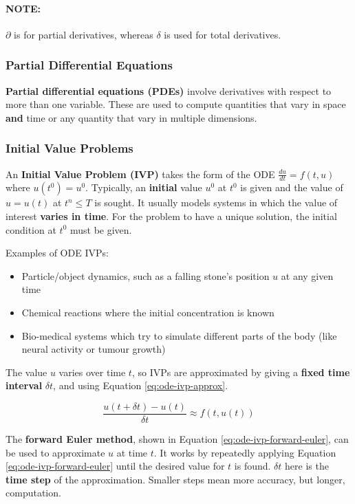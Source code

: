 \documentclass{article}
\begin{document}
\paragraph{\textbf{NOTE: }} $\partial$ is for partial derivatives, whereas $\delta$ is used for total derivatives.

\subsubsection{Partial Differential Equations}

\textbf{Partial differential equations (PDEs)} involve derivatives with respect to more than one variable. These are used to compute quantities that vary in space \textbf{and} time or any quantity that vary in multiple dimensions.

\subsubsection{Initial Value Problems}

An \textbf{Initial Value Problem (IVP)} takes the form of the ODE $\frac{du}{dt} = f(t, u)$ where $u(t^0) = u^0$. Typically, an \textbf{initial} value $u^0$ at $t^0$ is given and the value of $u = u(t)$ at $t^n \leq T$ is sought. It usually models systems in which the value of interest \textbf{varies in time}. For the problem to have a unique solution, the initial condition at $t^0$ must be given.

Examples of ODE IVPs:
\begin{itemize}
	\item Particle/object dynamics, such as a falling stone's position $u$ at any given time
	\item Chemical reactions where the initial concentration is known
	\item Bio-medical systems which try to simulate different parts of the body (like neural activity or tumour growth)
\end{itemize}

The value $u$ varies over time $t$, so IVPs are approximated by giving a \textbf{fixed time interval} $\delta t$, and using Equation \ref{eq:ode-ivp-approx}.

\begin{equation}
	\frac{u(t + \delta t) - u(t)}{\delta t} \approx f(t, u(t))
	\label{eq:ode-ivp-approx}
\end{equation}

The \textbf{forward Euler method}, shown in Equation \ref{eq:ode-ivp-forward-euler}, can be used to approximate $u$ at time $t$. It works by repeatedly applying Equation \ref{eq:ode-ivp-forward-euler} until the desired value for $t$ is found. $\delta t$ here is the \textbf{time step} of the approximation. Smaller steps mean more accuracy, but longer, computation.
\end{document}
